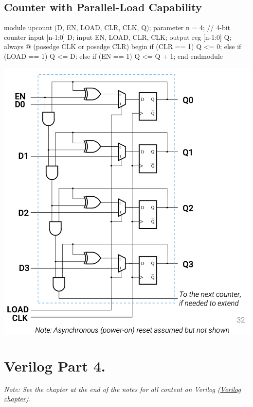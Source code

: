 \documentclass[12pt,openany]{book}
\begin{document}
\subsection{Counter with Parallel-Load Capability}
\begin{minipage}[htp]{0.4\textwidth}
\begin{vhdl}
module upcount (D, EN, LOAD, CLR, CLK, Q);
parameter n = 4; // 4-bit counter
input [n-1:0] D;
input EN, LOAD, CLR, CLK;
output reg [n-1:0] Q;
	always @ (posedge CLK or posedge CLR)
	begin
		if (CLR == 1) Q <= 0;
		else if (LOAD == 1) Q <= D;
		else if (EN == 1) Q <= Q + 1;
	end
endmodule
\end{vhdl}
\end{minipage}
\hfill
\vline
\hfill
\begin{minipage}[htp]{0.4\textwidth}
\includegraphics[width=1.3\textwidth]{circuits/14.5_3.png}
\end{minipage}	
\section{Verilog Part 4.}
 \textit{Note: See the chapter at the end of the notes for all content on Verilog (\hyperref[Verilog]{Verilog chapter}).}
\end{document}
